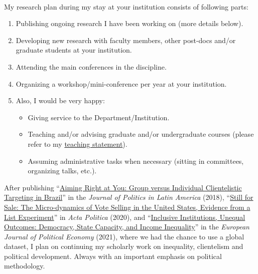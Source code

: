 \documentclass[10pt,stdletter,dateno,sigleft]{newlfm} %
\begin{document}
\begin{newlfm}




\vspace{-2cm}{\bf \huge Research Plan}\\


My research plan during my stay at your institution consists of following parts: 

\begin{enumerate}
  \item Publishing ongoing research I have been working on (more details below).
  \item Developing new research with faculty members, other post-docs and/or graduate students at your institution.
  \item Attending the main conferences in the discipline.
  \item Organizing a workshop/mini-conference per year at your institution.
  \item Also, I would be very happy: 
    \begin{itemize}
      \item Giving service to the Department/Institution.
      \item Teaching and/or advising graduate and/or undergraduate courses (please refer to my \href{http://github.com/hbahamonde/Job_Market/raw/master/Bahamonde_Teaching_Statement.pdf}{teaching statement}).
      \item Assuming administrative tasks when necessary (sitting in committees, organizing talks, etc.).
    \end{itemize}
\end{enumerate}


After publishing ``\href{https://journals.sub.uni-hamburg.de/giga/jpla/article/view/1121/1128}{Aiming Right at You: Group versus Individual Clientelistic Targeting in Brazil}'' in the \emph{Journal of Politics in Latin America} (2018), ``\href{https://link.springer.com/article/10.1057/s41269-020-00174-4}{Still for Sale: The Micro-dynamics of Vote Selling in the United States, Evidence from a List Experiment}'' in \emph{Acta Politica} (2020), and ``\href{https://doi.org/10.1016/j.ejpoleco.2021.102048}{Inclusive Institutions, Unequal Outcomes: Democracy, State Capacity, and Income Inequality}'' in the \emph{European Journal of Political Economy} (2021), where we had the chance to use a global dataset, I plan on continuing my scholarly work on inequality, clientelism and political development. Always with an important emphasis on political methodology.


\end{newlfm}
\end{document}
